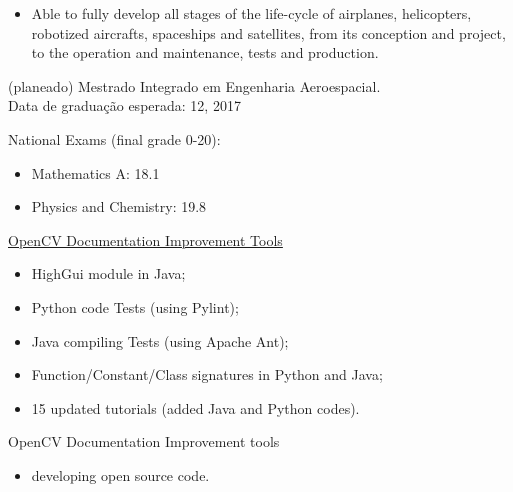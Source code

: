 \documentclass{article}
\begin{document}
\begin{llist}
{\begin{itemize}
\item[\textendash] Able to fully develop all stages of the life-cycle of airplanes, helicopters, robotized aircrafts, spaceships and satellites, from its conception and project, to the operation and maintenance, tests and production.
\end{itemize}
}
{
(planeado) Mestrado Integrado em Engenharia Aeroespacial.\\
Data de gradua\c{c}\~{a}o esperada: 12, 2017
}

 
National Exams (final grade 0-20):
\begin{itemize}
\item[\textendash] Mathematics A: 18.1
\item[\textendash] Physics and Chemistry: 19.8
\end{itemize}

{
}
{
}
\vspace{-0.33cm}

{
\href{https://summerofcode.withgoogle.com/projects/\#6351260335734784}{OpenCV Documentation Improvement Tools}
\vspace{-0.33cm}
\begin{itemize}
\item[\textendash] HighGui module in Java;
\item[\textendash] Python code Tests (using Pylint);
\item[\textendash] Java compiling Tests (using Apache Ant);
\item[\textendash] Function/Constant/Class signatures in Python and Java;
\item[\textendash] 15 updated tutorials (added Java and Python codes).
\end{itemize}
}
{
OpenCV Documentation Improvement tools
\vspace{-0.33cm}
\begin{itemize}
 \item developing open source code.
\end{itemize}
}


\end{llist}
\end{document}
